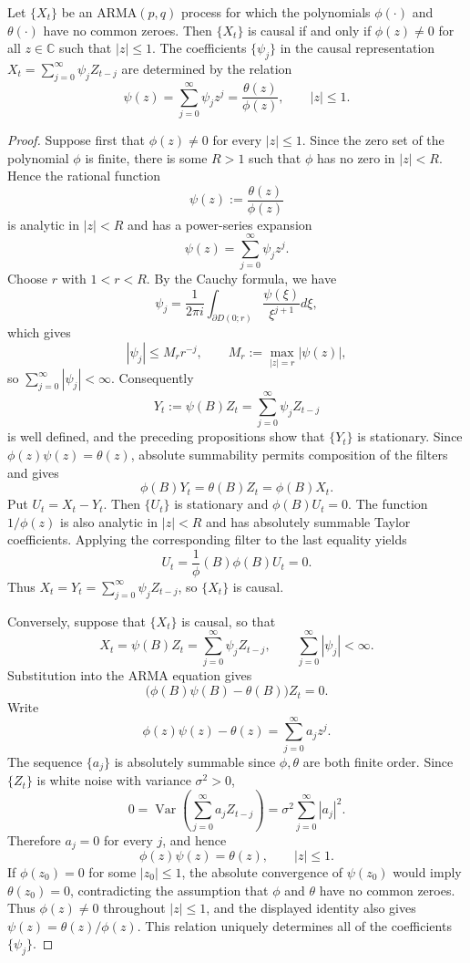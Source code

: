 \begin{theorem}
Let $\{X_t\}$ be an ARMA$(p,q)$ process for which the polynomials
$\phi(\cdot)$ and $\theta(\cdot)$ have no common zeroes. Then $\{X_t\}$
is causal if and only if $\phi(z)\neq0$ for all $z\in\mathbb{C}$ such that
$|z|\leq1$. The coefficients $\{\psi_j\}$ in the causal representation
$X_t=\sum_{j=0}^{\infty}\psi_jZ_{t-j}$ are determined by the relation
\[
\psi(z)=\sum_{j=0}^{\infty}\psi_jz^j
=\frac{\theta(z)}{\phi(z)},
\qquad |z|\leq 1.
\]
\end{theorem}
\begin{proof}
Suppose first that $\phi(z)\neq0$ for every $|z|\leq1$. Since the
zero set of the polynomial $\phi$ is finite, there is some $R>1$ such
that $\phi$ has no zero in $|z|<R$. Hence the rational function
\[
\psi(z):=\frac{\theta(z)}{\phi(z)}
\]
is analytic in $|z|<R$ and has a power-series expansion
\[
\psi(z)=\sum_{j=0}^{\infty}\psi_jz^j.
\]
Choose $r$ with $1<r<R$. By the Cauchy formula, we have
\[
\psi_j = \dfrac{1}{2\pi i}\int_{\partial D(0;r)} \dfrac{\psi(\xi)}{\xi^{j+1}}d\xi,
\]
which gives
\[
|\psi_j|\leq M_r r^{-j},
\qquad
M_r:=\max_{|z|=r}|\psi(z)|,
\]
so $\sum_{j=0}^{\infty}|\psi_j|<\infty$. Consequently
\[
Y_t:=\psi(B)Z_t=\sum_{j=0}^{\infty}\psi_jZ_{t-j}
\]
is well defined, and the preceding propositions show that $\{Y_t\}$ is
stationary. Since $\phi(z)\psi(z)=\theta(z)$, absolute summability permits
composition of the filters and gives
\[
\phi(B)Y_t=\theta(B)Z_t=\phi(B)X_t.
\]
Put $U_t=X_t-Y_t$. Then $\{U_t\}$ is stationary and
$\phi(B)U_t=0$. The function $1/\phi(z)$ is also analytic in $|z|<R$
and has absolutely summable Taylor coefficients. Applying the corresponding
filter to the last equality yields
\[
U_t=\frac{1}{\phi}(B)\phi(B)U_t=0.
\]
Thus $X_t=Y_t=\sum_{j=0}^{\infty}\psi_jZ_{t-j}$, so $\{X_t\}$ is
causal.

Conversely, suppose that $\{X_t\}$ is causal, so that
\[
X_t=\psi(B)Z_t=\sum_{j=0}^{\infty}\psi_jZ_{t-j},
\qquad
\sum_{j=0}^{\infty}|\psi_j|<\infty.
\]
Substitution into the ARMA equation gives
\[
\bigl(\phi(B)\psi(B)-\theta(B)\bigr)Z_t=0.
\]
Write
\[
\phi(z)\psi(z)-\theta(z)=\sum_{j=0}^{\infty}a_jz^j.
\]
The sequence $\{a_j\}$ is absolutely summable since $\phi,\theta$ are both finite order. Since $\{Z_t\}$ is
white noise with variance $\sigma^2>0$,
\[
0=\operatorname{Var}\left(\sum_{j=0}^{\infty}a_jZ_{t-j}\right)
=\sigma^2\sum_{j=0}^{\infty}|a_j|^2.
\]
Therefore $a_j=0$ for every $j$, and hence
\[
\phi(z)\psi(z)=\theta(z),
\qquad |z|\leq1.
\]
If $\phi(z_0)=0$ for some $|z_0|\leq1$, the absolute convergence of
$\psi(z_0)$ would imply $\theta(z_0)=0$, contradicting the assumption that
$\phi$ and $\theta$ have no common zeroes. Thus $\phi(z)\neq0$ throughout
$|z|\leq1$, and the displayed identity also gives
$\psi(z)=\theta(z)/\phi(z)$. This relation uniquely determines all of the
coefficients $\{\psi_j\}$.
\end{proof}

